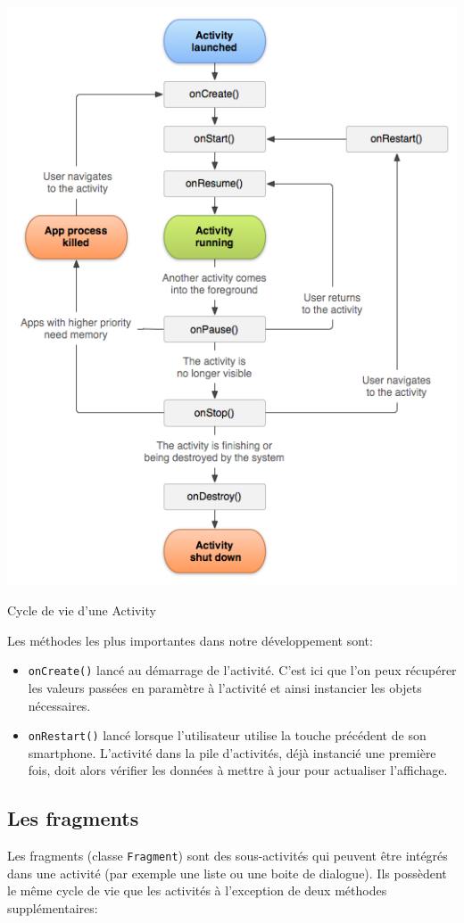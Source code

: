 \begin{img}
  \includegraphics[scale=0.5]{img/cycle.png}
  \caption{Cycle de vie d'une Activity}
\end{img}

Les méthodes les plus importantes dans notre développement sont:\bigskip
 \begin{itemize}
 	\item \verb!onCreate()! lancé au démarrage de l'activité. C'est ici que l'on peux récupérer les valeurs passées en paramètre à l'activité et ainsi instancier les objets nécessaires.
 	\item \verb!onRestart()! lancé lorsque l'utilisateur utilise la touche précédent de son smartphone. L'activité dans la pile d'activités, déjà instancié une première fois, doit alors vérifier les données à mettre à jour pour actualiser l'affichage.
 \end{itemize}

\subsection{Les fragments}
Les fragments (classe \verb!Fragment!) sont des sous-activités qui peuvent être intégrés dans une activité (par exemple une liste ou une boite de dialogue). Ils possèdent le même cycle de vie que les activités à l'exception de deux méthodes supplémentaires:\bigskip
 
